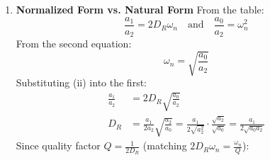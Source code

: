\begin{enumerate}
\begin{enumerate}
        \begin{align*}
          \left( \frac{a_1}{2a_2} \right)^2 &= \frac{a_0}{a_2} \\
          \frac{a_1^2}{4 a_2^2} &= \frac{a_0}{a_2} \\
          a_1^2 &= 4 a_0 a_2 \hspace{1cm} [\times 4 a_2^2]
        \end{align*}
      \item \textbf{Two complex conjugate poles (underdamped):} Let \( p_{1,2} = p_r \pm j p_i \), with real \( p_r > 0 \), \( p_i \neq 0 \) (poles at \(-p_r \mp j p_i\)).
        Then \(p_1 + p_2 = 2p_r\) and \(p_1 p_2 = (p_r + jp_i)(p_r - jp_i) = p_r^2 - j^2 p_i^2 = p_r^2 + p_i^2\).
        \begin{align*}
          \frac{a_1}{a_2} &= 2p_r \quad \Rightarrow \quad p_r = \frac{a_1}{2a_2} \tag{i} \\
          \frac{a_0}{a_2} &= p_r^2 + p_i^2 \quad \Rightarrow \quad p_r^2 + p_i^2 = \frac{a_0}{a_2} \tag{ii}
        \end{align*}
        Substituting (i) into (ii):
        \begin{align*}
          \left( \frac{a_1}{2a_2} \right)^2 + p_i^2 &= \frac{a_0}{a_2} \\
          p_i^2 &= \frac{a_0}{a_2} - \frac{a_1^2}{4a_2^2} \\
          p_i &= \sqrt{\frac{a_0}{a_2} - \frac{a_1^2}{4a_2^2}} \hspace{1cm} [\text{real for } a_1^2 < 4 a_0 a_2]
        \end{align*}
    \end{enumerate}
    These relations help determine pole locations from
    polynomial coefficients and help in pole placement
    design (choose k to set pole separation).
  \item \textbf{Normalized Form vs. Natural Form}
    \noindent From the table:
    \[ \frac{a_1}{a_2} = 2D_R\omega_n \quad \text{and} \quad \frac{a_0}{a_2} = \omega_n^2 \]
    From the second equation:
    \[ \omega_n = \sqrt{\frac{a_0}{a_2}} \tag{ii} \]
    Substituting (ii) into the first:
    \begin{align*}
    \frac{a_1}{a_2} &= 2D_R \sqrt{\frac{a_0}{a_2}} \\
    D_R &= \frac{a_1}{2 a_2}\sqrt{\frac{a_2}{a_0}} = \frac{a_1}{2\sqrt{a_2^2}}\cdot\frac{\sqrt{a_2}}{\sqrt{a_0}} = \frac{a_1}{2\sqrt{a_0 a_2}}
    \end{align*}
    Since quality factor \( Q = \frac{1}{2D_R} \) (matching \(2D_R\omega_n = \frac{\omega_n}{Q}\)):

\end{enumerate}
